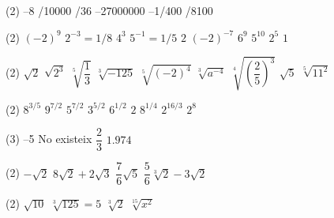 \documentclass{article}
\let\frac\dfrac
\begin{document}
  \begin{multicols}{2}
  	\small
  	\begin{mylist}
  		\item \begin{tasks}(2)
  			\task --8
  			/10000
  			/36
  			\task --27000000
  			\task --1/400
  			/8100
  		\end{tasks}
  	 
  	\item \begin{tasks}(2)
  		\task $(-2)^9$
  		\task $2^{-3}=1/8$
  		\task $4^3$
  		\task $5^{-1}=1/5$
  		\task $2$
  		\task $(-2)^{-7}$
  		\task $6^9$
  		\task $5^{10}$
  		\task $2^5$
  		\task $1$
  	\end{tasks}
  		
  	\item \begin{tasks}(2)
  		\task $\sqrt{2}$
  		\task $\sqrt{2^3}$
  		\task $\sqrt[5]{\frac{1}{3}}$
  		\task $\sqrt[3]{-125}$
  		\task $\sqrt[5]{(-2)^4}$
  		\task $\sqrt[3]{a^{-4}}$
  		\task $\sqrt[4]{\left(\frac{2}{5}\right)^3}$
  		\task $\sqrt{5}$
  		\task $\sqrt[5]{11^2}$
  	\end{tasks}
  
  \item
   \begin{tasks}(2)
  	\task $8^{3/5}$
  	\task $9^{7/2}$
  	\task $5^{7/2}$
  	\task $3^{5/2}$
  	\task $6^{1/2}$
  	\task $2$
	\task $8^{1/4}$
	\task $2^{16/3}$
	\task $2^{8}$
  \end{tasks}

\item \begin{tasks}(3)
	\task --5
	\task No existeix
	\task $\frac{2}{3}$
	\task $1.974$
\end{tasks}

\item  \begin{tasks}(2)
	\task $-\sqrt{2}$
	\task $8\sqrt{2}+2\sqrt{3}$
	\task $\frac{7}{6}\sqrt{5}$
	\task $\frac{5}{6}\sqrt[3]{2} -3\sqrt{2}$
\end{tasks}

\item \begin{tasks}(2)
	\task $\sqrt{10}$
	\task $\sqrt[3]{125}=5$
	\task $\sqrt[3]{2}$
	\task $\sqrt[15]{x^2}$
\end{tasks}


\end{mylist}
\end{multicols}
\end{document}
